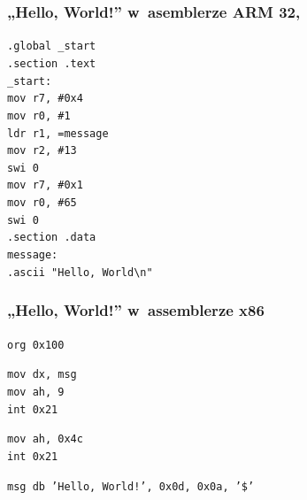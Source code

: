 \documentclass[10pt,t]{beamer}
\begin{document}
\begin{frame}
  \frametitle{„Hello, World!” w~asemblerze ARM 32,
    \parencite{Low-Level-Learning-You-Can-Learn-ARM-ETC-Ver-2020}}


  \texttt{.global \_start} \\
  \texttt{.section .text} \\



  \texttt{\_start:} \\[-0.2em]
  \hphantom{aaaaaaaa} \texttt{mov r7, \#0x4} \\
  \hphantom{aaaaaaaa} \texttt{mov r0, \#1} \\
  \hphantom{aaaaaaaa} \texttt{ldr r1, =message} \\
  \hphantom{aaaaaaaa} \texttt{mov r2, \#13} \\

  \hphantom{aaaaaaaa} \texttt{swi 0} \\

  \hphantom{aaaaaaaa} \texttt{mov r7, \#0x1} \\
  \hphantom{aaaaaaaa} \texttt{mov r0, \#65} \\

  \hphantom{aaaaaaaa} \texttt{swi 0} \\



  \texttt{.section .data} \\
  \texttt{message:} \\
  \hphantom{aaaaaaaa} \texttt{.ascii "Hello, World\textbackslash n"}

\end{frame}




\begin{frame}
  \frametitle{„Hello, World!” w~assemblerze x86
    \parencite{Anonymous-Hello-World-in-x86-Assembly-Language}}


  \texttt{org 0x100} \\
  \vspace{0.8em}

  \texttt{mov dx, msg} \\
  \texttt{mov ah, 9} \\
  \texttt{int 0x21} \\
  \vspace{0.8em}

  \texttt{mov ah, 0x4c} \\
  \texttt{int 0x21} \\
  \vspace{0.8em}

  \texttt{msg db 'Hello, World!', 0x0d, 0x0a, '\$'}

\end{frame}
\end{document}
